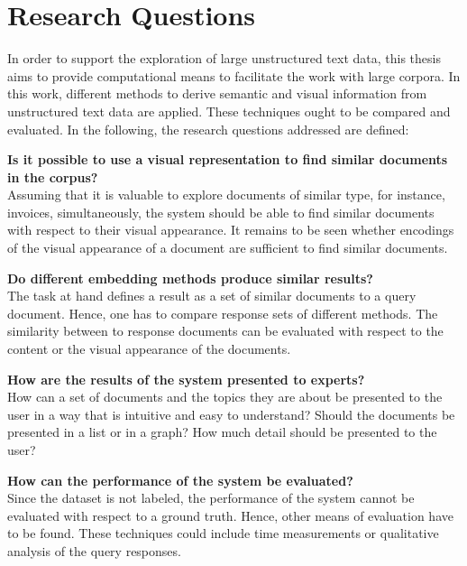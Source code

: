 \section{Research Questions}\label{sec:research-questions}

In order to support the exploration of large unstructured text data, 
this thesis aims to provide computational means to facilitate the work with large corpora.
In this work, different methods to derive semantic and visual information from unstructured text data are applied.
These techniques ought to be compared and evaluated.
In the following, the research questions addressed are defined:
\begin{questions}%
    \item \textbf{Is it possible to use a visual representation to find similar documents in the corpus?}\label{enum:rq1} \hfill \\
    Assuming that it is valuable to explore documents of similar type, for instance, invoices, simultaneously,
    the system should be able to find similar documents with respect to their visual appearance.
    It remains to be seen whether encodings of the visual appearance of a document are sufficient to find similar documents.

    \item \textbf{Do different embedding methods produce similar results?}\label{enum:rq2} \hfill \\
    The task at hand defines a result as a set of similar documents to a query document.
    Hence, one has to compare response sets of different methods.
    The similarity between to response documents can be evaluated with respect to the content or the visual appearance of the documents. 
    
    \item \textbf{How are the results of the system presented to experts?}\label{enum:rq3} \hfill \\
    How can a set of documents and the topics they are about be presented to the user in a way that is intuitive and easy to understand?
    Should the documents be presented in a list or in a graph?
    How much detail should be presented to the user?
    
    \item \textbf{How can the performance of the system be evaluated?}\label{enum:rq4} \hfill \\
    Since the dataset is not labeled, the performance of the system cannot be evaluated with respect to a ground truth.
    Hence, other means of evaluation have to be found.
    These techniques could include time measurements or qualitative analysis of the query responses.

\end{questions}